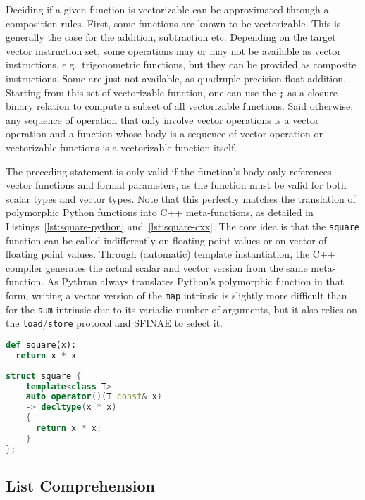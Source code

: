 \documentclass[preprint]{sigplanconf}
\begin{document}
Deciding if a given function is vectorizable can be approximated through a
composition rules. First, some functions are known to be vectorizable. This is
generally the case for the addition, subtraction etc. Depending on the target
vector instruction set, some operations may or may not be available as vector
instructions, e.g.\ trigonometric functions, but they can be provided as
composite instructions. Some are just not available, as quadruple precision
float addition. Starting from this set of vectorizable function, one can use
the \texttt{;} as a closure binary relation to compute a subset of all
vectorizable functions. Said otherwise, any sequence of operation that only
involve vector operations is a vector operation and a function whose body is a
sequence of vector operation or vectorizable functions is a vectorizable
function itself.

The preceding statement is only valid if the function's body only references
vector functions and formal parameters, as the function must be valid for both
scalar types and vector types. Note that this perfectly matches the translation
of polymorphic Python functions into C++ meta-functions, as detailed in
Listings~\ref{lst:square-python} and~\ref{lst:square-cxx}. The core idea is that
the \texttt{square} function can be called indifferently on floating point
values or on vector of floating point values. Through (automatic) template
instantiation, the C++ compiler generates the actual scalar and vector version
from the same meta-function. As Pythran always translates Python's polymorphic
function in that form, writing a vector version of the \texttt{map} intrinsic is
slightly more difficult than for the \texttt{sum} intrinsic due to its variadic
number of arguments, but it also relies on the \texttt{load}/\texttt{store}
protocol and SFINAE to select it.

\begin{lstlisting}[language=python, label={lst:square-python}, caption={Python implementation of the square function.}]
def square(x):
  return x * x
\end{lstlisting}

\begin{lstlisting}[language=c++, label={lst:square-cxx}, caption={C++ meta-implementation of the square function.}]
struct square {
    template<class T>
    auto operator()(T const& x)
    -> decltype(x * x)
    {
      return x * x;
    }
};
\end{lstlisting}

\subsection{List Comprehension}
\end{document}
